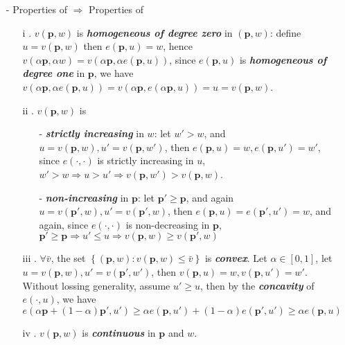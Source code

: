 \begin{enumerate}
    \item[-] Properties  of $\Rightarrow$ Properties of  
    \begin{enumerate}
        \item[i] . $v(\mathbf{p},w)$ is \textit{\textbf{homogeneous of degree zero}} in $(\mathbf{p},w)$: define $u=v(\mathbf{p},w)$ then $e(\mathbf{p},u)=w$, hence $v(\alpha\mathbf{p},\alpha w)=v(\alpha\mathbf{p},\alpha e(\mathbf{p},u))$, since $e(\mathbf{p},u)$ is \textit{\textbf{homogeneous of degree one}} in $\mathbf{p}$, we have $v(\alpha \mathbf{p},\alpha e(\mathbf{p},u))=v(\alpha\mathbf{p},e(\alpha \mathbf{p},u))=u=v(\mathbf{p},w)$.
        \item[ii] . $v(\mathbf{p},w)$ is
        \begin{enumerate}
            \item[-] \textit{\textbf{strictly increasing}} in $w$: let $w'>w$, and $u=v(\mathbf{p},w),u'=v(\mathbf{p},w')$, then $e(\mathbf{p},u)=w,e(\mathbf{p},u')=w'$, since $e(\cdot,\cdot)$ is strictly increasing in $u$, $w'>w\Rightarrow u>u'\Rightarrow v(\mathbf{p},w')>v(\mathbf{p},w)$.
            \item[-] \textit{\textbf{non-increasing}} in $\mathbf{p}$: let $\mathbf{p}'\geq \mathbf{p}$, and again $u=v(\mathbf{p}',w),u'=v(\mathbf{p}',w)$, then $e(\mathbf{p},u)=e(\mathbf{p}',u')=w$, and again, since $e(\cdot,\cdot)$ is non-decreasing in $\mathbf{p}$, $\mathbf{p}'\geq \mathbf{p}\Rightarrow u'\leq u\Rightarrow v(\mathbf{p},w)\geq v(\mathbf{p}',w)$
        \end{enumerate}
        \item[iii] . $\forall \bar{v}$, the set $\left\{(\mathbf{p},w):v(\mathbf{p},w)\leq \bar{v}\right\}$ is \textit{\textbf{convex}}. Let $\alpha \in[0,1]$, let $u=v(\mathbf{p},w),u'=v(\mathbf{p}',w')$, then $v(\mathbf{p},u)=w,v(\mathbf{p},u')=w'$. Without lossing generality, assume $u'\geq u$, then by the \textit{\textbf{concavity}} of $e(\cdot,u)$, we have $e(\alpha\mathbf{p}+(1-\alpha)\mathbf{p}',u')\geq \alpha e(\mathbf{p},u')+(1-\alpha)e(\mathbf{p}',u')\geq \alpha e(\mathbf{p},u)$
        \item[iv] . $v(\mathbf{p},w)$ is \textit{\textbf{continuous}} in $\mathbf{p}$ and $w$.
    \end{enumerate} 
\end{enumerate}



